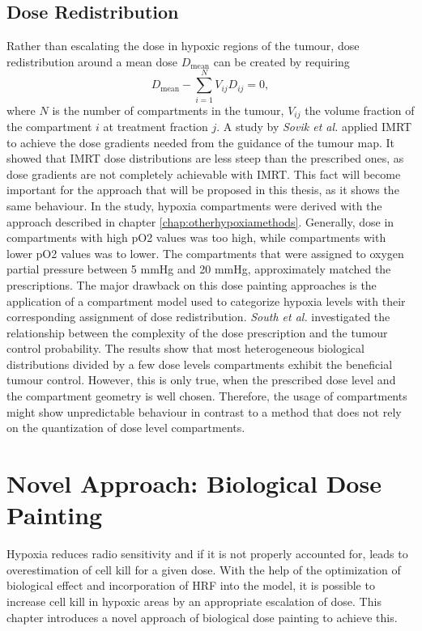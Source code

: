\subsection{Dose Redistribution}
Rather than escalating the dose in hypoxic regions of the tumour, dose redistribution around a mean dose $D_\mathrm{mean}$ can be created by requiring
\begin{equation}
D_\mathrm{mean} - \sum\limits_{i=1}^NV_{ij}D_{ij} = 0,
\end{equation}
where $N$ is the number of compartments in the tumour, $V_{ij}$ the volume fraction of the compartment $i$ at treatment fraction $j$. A study by \textit{Sovik et al.} \cite{pmid17674980} applied IMRT to achieve the dose gradients needed from the guidance of the tumour map. It showed that IMRT dose distributions are less steep than the prescribed ones, as dose gradients are not completely  achievable with IMRT. This fact will become important for the approach that will be proposed in this thesis, as it shows the same behaviour. In the study, hypoxia compartments were derived with the approach described in chapter \ref{chap:otherhypoxiamethods}. Generally, dose in compartments with high pO2 values was too high, while compartments with lower pO2 values was to lower. The compartments that were assigned to oxygen partial pressure between 5 mmHg and 20 mmHg, approximately matched the prescriptions. The major drawback on this dose painting approaches is the application of a compartment model used to categorize hypoxia levels with their corresponding assignment of dose redistribution. \textit{South et al.} \cite{pmid19928068} investigated the relationship between the complexity of the dose prescription and the tumour control probability. The results show that most heterogeneous biological distributions divided by a few dose levels compartments exhibit the beneficial tumour control. However, this is only true, when the prescribed dose level and the compartment geometry is well chosen. Therefore, the usage of compartments might show unpredictable behaviour in contrast to a method that does not rely on the quantization of dose level compartments.
\section{Novel Approach: Biological Dose Painting}
Hypoxia reduces radio sensitivity and if it is not properly accounted for, leads to overestimation of cell kill for a given dose. With the help of the optimization of biological effect and incorporation of HRF into the model, it is possible to increase cell kill in hypoxic areas by an appropriate escalation of dose. This chapter introduces a novel approach of biological dose painting to achieve this.

